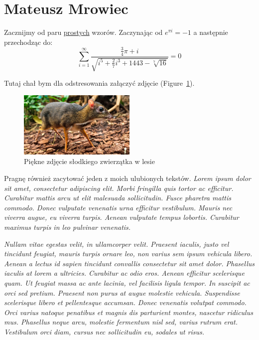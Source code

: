 \section{Mateusz Mrowiec}
\label{sec:mmrowiec}

Zacznijmy od paru \underline{prostych} wzorów. Zaczynając od $e^{\pi i} = -1$ a następnie przechodząc do:
\[
\sum_{i=1}^\infty \frac{\frac{3}{4}\pi + i}{\sqrt{i^5+\frac{2}{7}i^3+1443-\sqrt[7]{16}}} = 0
\]

Tutaj chał bym dla odstresowania załączyć zdjęcie (Figure~\ref{fig:mysz}).

\begin{figure}[h]
\centering
\includegraphics[width=0.5\textwidth]{pictures/Myszojelen.jpg}
\caption{Piękne zdjęcie słodkiego zwierzątka w lesie}
\label{fig:mysz}
\end{figure}

Pragnę również zacytować jeden z moich ulubionych tekstów.
\newline\newline
\textit{Lorem ipsum dolor sit amet, consectetur adipiscing elit. Morbi fringilla quis tortor ac efficitur. Curabitur mattis arcu ut elit malesuada sollicitudin. Fusce pharetra mattis commodo. Donec vulputate venenatis urna efficitur vestibulum. Mauris nec viverra augue, eu viverra turpis. Aenean vulputate tempus lobortis. Curabitur maximus turpis in leo pulvinar venenatis.}

\textit{Nullam vitae egestas velit, in ullamcorper velit. Praesent iaculis, justo vel tincidunt feugiat, mauris turpis ornare leo, non varius sem ipsum vehicula libero. Aenean a lectus id sapien tincidunt convallis consectetur sit amet dolor. Phasellus iaculis at lorem a ultricies. Curabitur ac odio eros. Aenean efficitur scelerisque quam. Ut feugiat massa ac ante lacinia, vel facilisis ligula tempor. In suscipit ac orci sed pretium. Praesent non purus at augue molestie vehicula. Suspendisse scelerisque libero et pellentesque accumsan. Donec venenatis volutpat commodo. Orci varius natoque penatibus et magnis dis parturient montes, nascetur ridiculus mus. Phasellus neque arcu, molestie fermentum nisl sed, varius rutrum erat. Vestibulum orci diam, cursus nec sollicitudin eu, sodales ut risus.}


